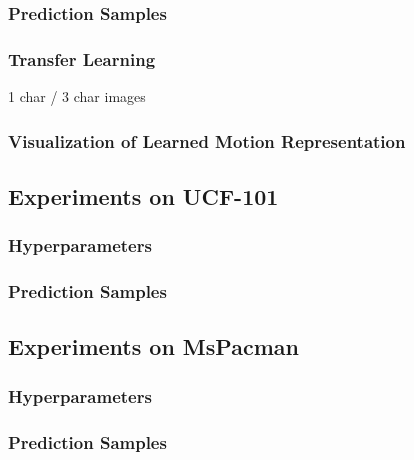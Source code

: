 \subsubsection{Prediction Samples}

\subsubsection{Transfer Learning}

1 char / 3 char images

\subsubsection{Visualization of Learned Motion Representation}


\subsection{Experiments on UCF-101}

\subsubsection{Hyperparameters}

\subsubsection{Prediction Samples}


\subsection{Experiments on MsPacman}

\subsubsection{Hyperparameters}

\subsubsection{Prediction Samples}







